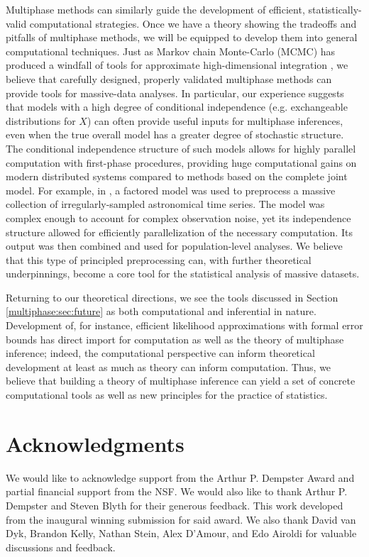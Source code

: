 Multiphase methods can similarly guide the development of efficient, statistically-valid computational strategies.
Once we have a theory showing the tradeoffs and pitfalls of multiphase methods, we will be equipped to develop them into general computational techniques.
Just as Markov chain Monte-Carlo (MCMC) has produced a windfall of tools for approximate high-dimensional integration \citep[see][for many examples]{Brooks2010}, we believe that carefully designed, properly validated multiphase methods can provide tools for massive-data analyses.
In particular, our experience suggests that models with a high degree of conditional independence (e.g. exchangeable distributions for $X$) can often provide useful inputs for multiphase inferences, even when the true overall model has a greater degree of stochastic structure.
The conditional independence structure of such models allows for highly parallel computation with first-phase procedures, providing huge computational gains on modern distributed systems compared to methods based on the complete joint model.
For example, in \citet{Blocker2012}, a factored model was used to preprocess a massive collection of irregularly-sampled astronomical time series.
The model was complex enough to account for complex observation noise, yet its independence structure allowed for efficiently parallelization of the necessary computation.
Its output was then combined and used for population-level analyses.
We believe that this type of principled preprocessing can, with further theoretical underpinnings, become a core tool for the statistical analysis of massive datasets.

Returning to our theoretical directions, we see the tools discussed in Section \ref{multiphase:sec:future} as both computational and inferential in nature.
Development of, for instance, efficient likelihood approximations with formal error bounds has direct import for computation as well as the theory of multiphase inference; indeed, the computational perspective can inform theoretical development at least as much as theory can inform computation.
Thus, we believe that building a theory of multiphase inference can yield a set of concrete computational tools as well as new principles for the practice of statistics.

\section{Acknowledgments}
We would like to acknowledge support from the Arthur P. Dempster Award and partial financial support from the NSF.
We would also like to thank Arthur P. Dempster and Steven Blyth for their generous feedback.
This work developed from the inaugural winning submission for said award.
We also thank David van Dyk, Brandon Kelly, Nathan Stein, Alex D'Amour, and Edo Airoldi for valuable discussions and feedback.


